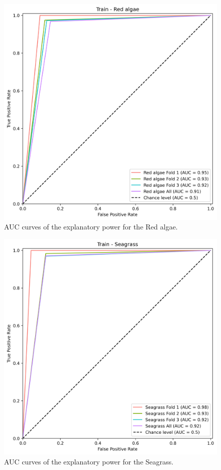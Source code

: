 \begin{figure}
\hypertarget{fig:chap3figS17}{%
\centering
\includegraphics{03-Chapitre3/figures/supplementary/03-receiver_operator_curve_train_rf_Red algae.png}
\caption{AUC curves of the explanatory power for the Red
algae.}\label{fig:chap3figS17}
}
\end{figure}

\begin{figure}
\hypertarget{fig:chap3figS18}{%
\centering
\includegraphics{03-Chapitre3/figures/supplementary/03-receiver_operator_curve_train_rf_Seagrass.png}
\caption{AUC curves of the explanatory power for the
Seagrass.}\label{fig:chap3figS18}
}
\end{figure}

